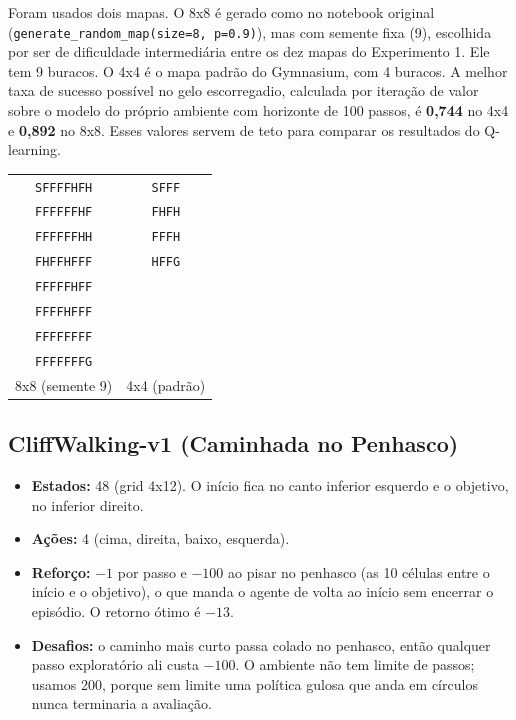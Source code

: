 \documentclass[11pt,a4paper]{article}
\begin{document}
Foram usados dois mapas. O 8x8 é gerado como no notebook original
(\texttt{generate\_random\_map(size=8, p=0.9)}), mas com semente fixa (9), escolhida por ser de dificuldade
intermediária entre os dez mapas do Experimento 1. Ele tem 9 buracos. O 4x4 é o mapa padrão do Gymnasium, com 4
buracos. A melhor taxa de sucesso possível no gelo escorregadio, calculada por iteração de valor sobre o modelo do
próprio ambiente com horizonte de 100 passos, é \textbf{0,744} no 4x4 e \textbf{0,892} no 8x8. Esses valores servem de
teto para comparar os resultados do Q-learning.

\begin{center}
\footnotesize
\renewcommand{\arraystretch}{0.8}
\begin{tabular}{cc}
\texttt{SFFFFHFH} & \texttt{SFFF}\\
\texttt{FFFFFFHF} & \texttt{FHFH}\\
\texttt{FFFFFFHH} & \texttt{FFFH}\\
\texttt{FHFFHFFF} & \texttt{HFFG}\\
\texttt{FFFFFHFF} & \\
\texttt{FFFFHFFF} & \\
\texttt{FFFFFFFF} & \\
\texttt{FFFFFFFG} & \\[0.3em]
8x8 (semente 9) & 4x4 (padrão)
\end{tabular}
\end{center}

\subsection*{CliffWalking-v1 (Caminhada no Penhasco)}

\begin{itemize}
  \item \textbf{Estados:} 48 (grid 4x12). O início fica no canto inferior esquerdo e o objetivo, no inferior direito.
  \item \textbf{Ações:} 4 (cima, direita, baixo, esquerda).
  \item \textbf{Reforço:} $-1$ por passo e $-100$ ao pisar no penhasco (as 10 células entre o início e o objetivo),
    o que manda o agente de volta ao início sem encerrar o episódio. O retorno ótimo é $-13$.
  \item \textbf{Desafios:} o caminho mais curto passa colado no penhasco, então qualquer passo exploratório ali custa
    $-100$. O ambiente não tem limite de passos; usamos 200, porque sem limite uma política gulosa que anda em
    círculos nunca terminaria a avaliação.
\end{itemize}
\end{document}
